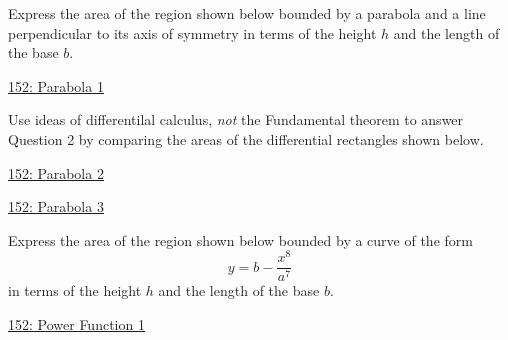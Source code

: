 \documentclass{ximera}
\begin{document}
\begin{question} \label{QOLDFKRerbttp}
Express the area of the region shown below bounded by a parabola and a line perpendicular to its axis of symmetry in terms of the height $h$ and the length of the base $b$.

\begin{onlineOnly}
    \begin{center}
\end{center}
\end{onlineOnly}

\href{https://www.desmos.com/calculator/kkdfpr66rt}{152: Parabola 1}

\end{question}


\begin{question}  \label{Q9erkmbzxee}
Use ideas of differentilal calculus, \emph{not} the Fundamental theorem to answer Question 2 by comparing the areas of the differential rectangles shown below.

\begin{onlineOnly}
    \begin{center}
\end{center}
\end{onlineOnly}

\href{https://www.desmos.com/calculator/pvskgbpnew}{152: Parabola 2}

\begin{onlineOnly}
    \begin{center}
\end{center}
\end{onlineOnly}

\href{https://www.desmos.com/calculator/0w37bixe79}{152: Parabola 3}

\end{question}



\begin{question} \label{QOLDefeefKRerbttp}
Express the area of the region shown below bounded by a curve of the form 
\[
   y=b - \frac{x^8}{a^7}
\]
in terms of the height $h$ and the length of the base $b$.

\begin{onlineOnly}
    \begin{center}
\end{center}
\end{onlineOnly}

\href{https://www.desmos.com/calculator/0mftg33xde}{152: Power Function 1}

\end{question}
\end{document}
